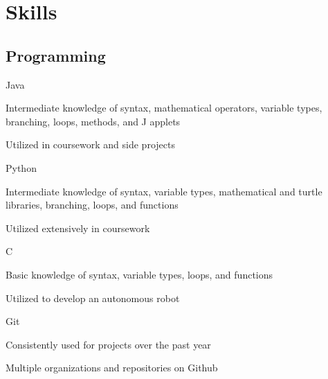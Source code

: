 \documentclass[]{resume-openfont}
\begin{document}
\begin{minipage}[t]{0.33\textwidth}

\section{Skills}
\subsection{Programming}
Java 
\begin{tightemize}
\vspace{\topsep}
\item Intermediate knowledge of syntax, mathematical operators, variable types, branching, loops, methods, and J applets \item Utilized in coursework and side projects\end{tightemize}
\vspace{\topsep}
Python
\begin{tightemize}
\vspace{\topsep}
\item Intermediate knowledge of syntax, variable types, mathematical and
turtle libraries, branching, loops, and functions \item Utilized extensively in coursework\end{tightemize}
\vspace{\topsep}
C
\begin{tightemize}
\vspace{\topsep}
\item Basic knowledge of syntax, variable types, loops, and functions \item Utilized to develop an autonomous robot\end{tightemize}
\vspace{\topsep}
Git
\begin{tightemize}
\vspace{\topsep}
\item Consistently used for projects over the past year \item Multiple organizations and repositories on Github\end{tightemize}


%
%

\end{minipage} 
\hfill
\end{document}
